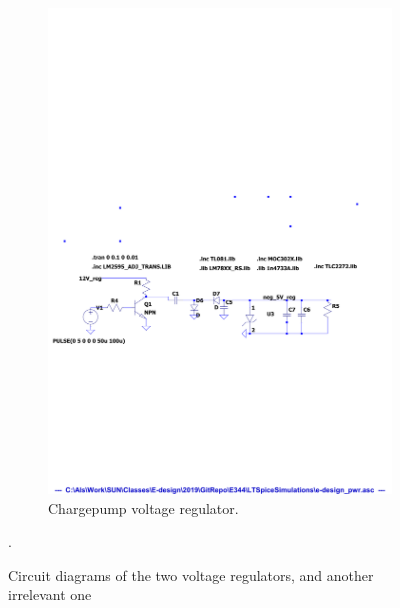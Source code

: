 \begin{figure}
\begin{subfigure}[]{1.1\textwidth}
  	 \includegraphics[width=\linewidth]{./Figures/CctDia}
	  \caption{Chargepump voltage regulator.} \label{subfig:chargepump_circuit_diagram}	
   \end{subfigure}
   
   \caption {Circuit diagrams of the two voltage regulators, and another irrelevant one}.

      \label{fig:circuit_diagram}
 \end{figure}

